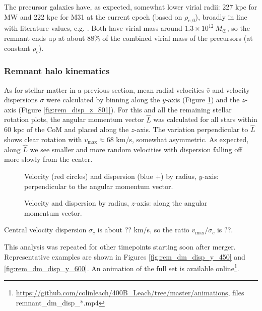 \documentclass[twocolumn]{aastex63}
\newcommand{\todo}{\color{red}{TODO}\color{black}\hspace{2mm}}
\begin{document}
The precursor galaxies have, as expected, somewhat lower virial radii: 227 kpc for MW and 222 kpc for M31 at the current epoch (based on $\rho_{c,0}$), broadly in line with literature values, e.g. \citep{dehnen_velocity_2006}. Both have virial mass around $1.3 \times 10^{12}\ M_\Sun$, so the remnant ends up at about 88\% of the combined virial mass of the precursors (at constant $\rho_c$).

\todo{Some more discussion would be useful!}


\subsubsection{Remnant halo kinematics}

As for stellar matter in a previous section, mean radial velocities $\bar{v}$ and velocity dispersions $\sigma$ were calculated by binning along the $y$-axis (Figure \ref{fig:rem_dm_disp_y_801}) and the $z$-axis (Figure \ref{fig:rem_disp_z_801}). For this and all the remaining stellar rotation plots, the angular momentum vector $\hat{L}$ was calculated for all stars within 60 kpc of the CoM and placed along the $z$-axis. The variation perpendicular to $\hat{L}$ shows clear rotation with $v_{\text{max}} \approx 68$ km/s, somewhat asymmetric. As expected, along $\hat{L}$ we see smaller and more random velocities with dispersion falling off more slowly from the center.

\begin{figure}[htb!]
	\caption{Velocity (red circles) and dispersion (blue +) by radius, $y$-axis: perpendicular to the angular momentum vector.
		\label{fig:rem_dm_disp_y_801}}
\end{figure}

\begin{figure}[htb!]
	\caption{Velocity and dispersion by radius, $z$-axis: along the angular momentum vector.
		\label{fig:rem_dm_disp_z_801}}
\end{figure}

Central velocity dispersion $\sigma_c$ is about ?? km/s, so the ratio $v_{\text{max}} / \sigma_c$ is ??. \todo{Comment}

This analysis was repeated for other timepoints starting soon after merger. Representative examples are shown in Figures \ref{fig:rem_dm_disp_y_450} and \ref{fig:rem_dm_disp_y_600}. An animation of the full set is available online\footnote{\url{https://github.com/colinleach/400B_Leach/tree/master/animations}, files remnant\_dm\_disp\_*.mp4 }.
\end{document}
